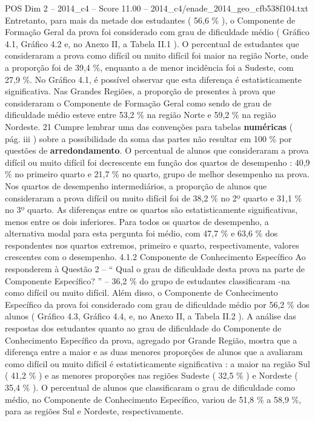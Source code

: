 \begin{textsample}{POS Dim 2 – 2014\_c4 – Score 11.00 – 2014\_c4/enade\_2014\_geo\_cfb538f104.txt}
Entretanto, para mais da metade dos estudantes ( 56,6 \% ), o Componente de Formação Geral da prova foi considerado com grau de dificuldade médio ( Gráfico 4.1, Gráfico 4.2 e, no Anexo II, a Tabela II.1 ).
O percentual de estudantes que consideraram a prova como difícil ou muito difícil foi maior na região Norte, onde a proporção foi de 39,4 \%, enquanto a de menor incidência foi a Sudeste, com 27,9 \%.
No Gráfico 4.1, é possível observar que esta diferença é estatisticamente significativa.
Nas Grandes Regiões, a proporção de presentes à prova que consideraram o Componente de Formação Geral como sendo de grau de dificuldade médio esteve entre 53,2 \% na região Norte e 59,2 \% na região Nordeste. 21 Cumpre lembrar uma das convenções para tabelas \textbf{numéricas} ( pág. iii ) sobre a possibilidade da soma das partes não resultar em 100 \% por questões de \textbf{arredondamento}.
O percentual de alunos que consideraram a prova difícil ou muito difícil foi decrescente em função dos quartos de desempenho : 40,9 \% no primeiro quarto e 21,7 \% no quarto, grupo de melhor desempenho na prova.
Nos quartos de desempenho intermediários, a proporção de alunos que consideraram a prova difícil ou muito difícil foi de 38,2 \% no 2º quarto e 31,1 \% no 3º quarto.
As diferenças entre os quartos são estatisticamente significativas, menos entre os dois inferiores.
Para todos os quartos de desempenho, a alternativa modal para esta pergunta foi médio, com 47,7 \% e 63,6 \% dos respondentes nos quartos extremos, primeiro e quarto, respectivamente, valores crescentes com o desempenho. 4.1.2 Componente de Conhecimento Específico Ao responderem à Questão 2 – “ Qual o grau de dificuldade desta prova na parte de Componente Específico? ” – 36,2 \% do grupo de estudantes classificaram -na como difícil ou muito difícil.
Além disso, o Componente de Conhecimento Específico da prova foi considerado com grau de dificuldade médio por 56,2 \% dos alunos ( Gráfico 4.3, Gráfico 4.4, e, no Anexo II, a Tabela II.2 ).
A análise das respostas dos estudantes quanto ao grau de dificuldade do Componente de Conhecimento Específico da prova, agregado por Grande Região, mostra que a diferença entre a maior e as duas menores proporções de alunos que a avaliaram como difícil ou muito difícil é estatisticamente significativa : a maior na região Sul ( 41,2 \% ) e as menores proporções nas regiões Sudeste ( 32,5 \% ) e Nordeste ( 35,4 \% ).
O percentual de alunos que classificaram o grau de dificuldade como médio, no Componente de Conhecimento Específico, variou de 51,8 \% a 58,9 \%, para as regiões Sul e Nordeste, respectivamente.

\end{textsample}
